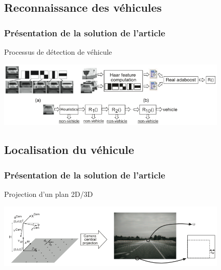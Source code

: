 \subsection{Reconnaissance des véhicules}
\begin{frame}
\frametitle{Présentation de la solution de l'article}

Processus de détection de véhicule
\begin{center}
  \includegraphics[width=11cm]{image/detectionVehicule.png}
\end{center}

\end{frame}

\subsection{Localisation du véhicule}
\begin{frame}
\frametitle{Présentation de la solution de l'article}

Projection d'un plan 2D/3D
\begin{center}
  \includegraphics[width=11cm]{image/position.png}
\end{center}

\end{frame}